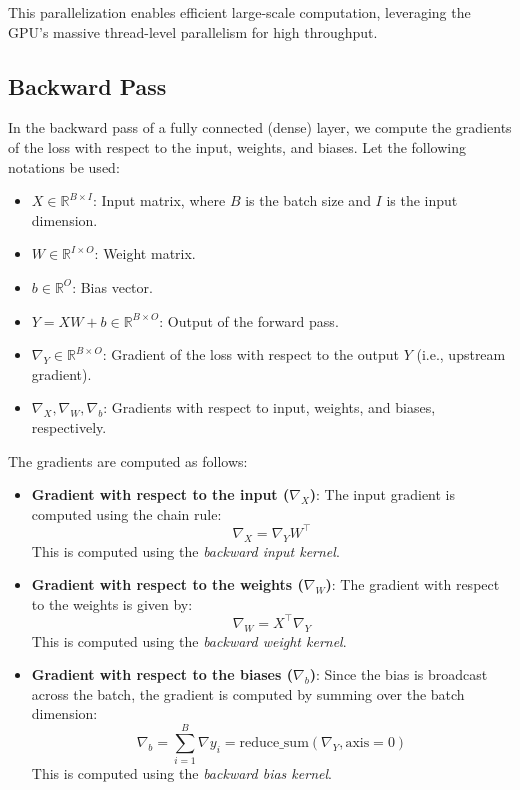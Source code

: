 This parallelization enables efficient large-scale computation, leveraging the GPU's massive thread-level parallelism for high throughput.

\subsection{Backward Pass}
In the backward pass of a fully connected (dense) layer, we compute the gradients of the loss with respect to the input, weights, and biases. Let the following notations be used:

\begin{itemize}
    \item \( X \in \mathbb{R}^{B \times I} \): Input matrix, where \( B \) is the batch size and \( I \) is the input dimension.
    \item \( W \in \mathbb{R}^{I \times O} \): Weight matrix.
    \item \( b \in \mathbb{R}^{O} \): Bias vector.
    \item \( Y = XW + b \in \mathbb{R}^{B \times O} \): Output of the forward pass.
    \item \( \nabla_Y \in \mathbb{R}^{B \times O} \): Gradient of the loss with respect to the output \( Y \) (i.e., upstream gradient).
    \item \( \nabla_X, \nabla_W, \nabla_b \): Gradients with respect to input, weights, and biases, respectively.
\end{itemize}

The gradients are computed as follows:

\begin{itemize}
    \item \textbf{Gradient with respect to the input (\( \nabla_X \))}:  
    The input gradient is computed using the chain rule:
    \[
        \nabla_X = \nabla_Y W^\top
    \]
    This is computed using the \textit{backward input kernel}.

    \item \textbf{Gradient with respect to the weights (\( \nabla_W \))}:  
    The gradient with respect to the weights is given by:
    \[
        \nabla_W = X^\top \nabla_Y
    \]
    This is computed using the \textit{backward weight kernel}.

    \item \textbf{Gradient with respect to the biases (\( \nabla_b \))}:  
    Since the bias is broadcast across the batch, the gradient is computed by summing over the batch dimension:
    \[
        \nabla_b = \sum_{i=1}^{B} \nabla y_i = \text{reduce\_sum}(\nabla_Y, \text{axis}=0)
    \]
    This is computed using the \textit{backward bias kernel}.
\end{itemize}

